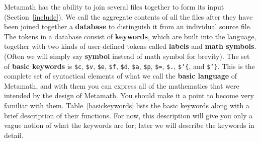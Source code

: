 Metamath has the ability to join several files together to form its
input (Section~\ref{include}).  We call the aggregate contents of all
the files after they have been joined together a {\bf
database} to distinguish it from an individual source
file.  The tokens in a database consist of {\bf
keywords}, which are built into the language, together
with two kinds of user-defined tokens called {\bf labels}
and {\bf math symbols}.  (Often we will simply say
{\bf symbol} instead of math symbol for brevity).  The set
of {\bf basic keywords} is
\texttt{\$c},
\texttt{\$v},
\texttt{\$e},
\texttt{\$f},
\texttt{\$d},
\texttt{\$a},
\texttt{\$p},
\texttt{\$=},
\texttt{\$.},
\texttt{\$\char`\{}, and \texttt{\$\char`\}}.  This is the complete set of
syntactical elements of what we call the {\bf basic
language} of Metamath, and with them you can
express all of the mathematics that were intended by the design of
Metamath.  You should make it a point to become very familiar with them.
Table~\ref{basickeywords} lists the basic keywords along with a brief
description of their functions.  For now, this description will give you
only a vague notion of what the keywords are for; later we will describe
the keywords in detail.


